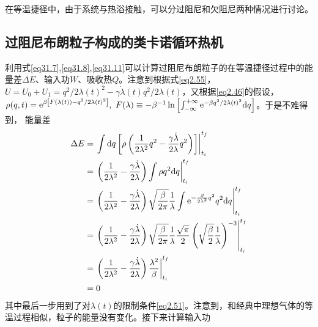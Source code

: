 在等温捷径中，由于系统与热浴接触，可以分过阻尼和欠阻尼两种情况进行讨论。

\subsection{过阻尼布朗粒子构成的类卡诺循环热机}
\label{sec3.2.1}
\qquad 利用式\eqref{eq31.7},\quad \eqref{eq31.8},\quad \eqref{eq31.11}可以计算过阻尼布朗粒子的在等温捷径过程中的能量差$\Delta E$、输入功$W$、吸收热$Q$。注意到根据式\eqref{eq2.55}，$U=U_0 + U_1 = q^2/{2 \lambda(t)^2}  -{\gamma \dot{\lambda}(t)  q^{2}}/{2 \lambda(t)}$，又根据\eqref{eq2.46}的假设，$\rho(q, t)= \mathrm{e}^{\beta\left[F(\lambda(t))-q^2/{2 \lambda(t)^2}\right]},\ F(\lambda) \equiv-\beta^{-1} \ln \left[\int_{-\infty}^{+\infty} \mathrm{e}^{-\beta q^2/{2 \lambda(t)^2}} \M{d} q \right]$。于是不难得到，
能量差
\begin{equation}
    \begin{split}
        \Delta E &=\left.\int \mathrm{d} q \left[\rho\left(\frac{1}{2 \lambda^2}q^2  -\frac{\gamma \dot{\lambda}}{2 \lambda} q^{2}\right)\right]\right|_{t_{i}} ^{t_{f}}\\
         &=\left.\left(\frac{1}{2 \lambda^2}  -\frac{\gamma \dot{\lambda}}{2 \lambda}\right)\int \rho q^2 \mathrm{d} q  \right|_{t_{i}} ^{t_{f}}\\
         &=\left.\left(\frac{1}{2 \lambda^2}  -\frac{\gamma \dot{\lambda}}{2 \lambda}\right)\sqrt{\frac{\beta}{2 \pi}} \frac{1}{\lambda} \int \mathrm{e}^{-\frac{\beta}{2 \lambda^2 } q^2} q^2 \mathrm{d} q  \right|_{t_{i}} ^{t_{f}}\\
         &=\left.\left(\frac{1}{2 \lambda^2}  -\frac{\gamma \dot{\lambda}}{2 \lambda}\right)\sqrt{\frac{\beta}{2 \pi}} \frac{1}{\lambda} \frac{\sqrt{\pi}}{2}\left(\sqrt{\frac{\beta}{2}} \frac{1}{\lambda}\right)^{-3} \right|_{t_{i}}^{t_{f}}\\
         &=\left.\left(\frac{1}{2 \lambda^2}  -\frac{\gamma \dot{\lambda}}{2 \lambda}\right) \frac{\lambda^2}{\beta} \right|_{t_{i}}^{t_{f}}\\
         &=0
    \end{split}
    \label{eq3.13}
\end{equation}
其中最后一步用到了对$\lambda(t)$的限制条件\eqref{eq2.51}。注意到，和经典中理想气体的等温过程相似，粒子的能量没有变化。接下来计算输入功
